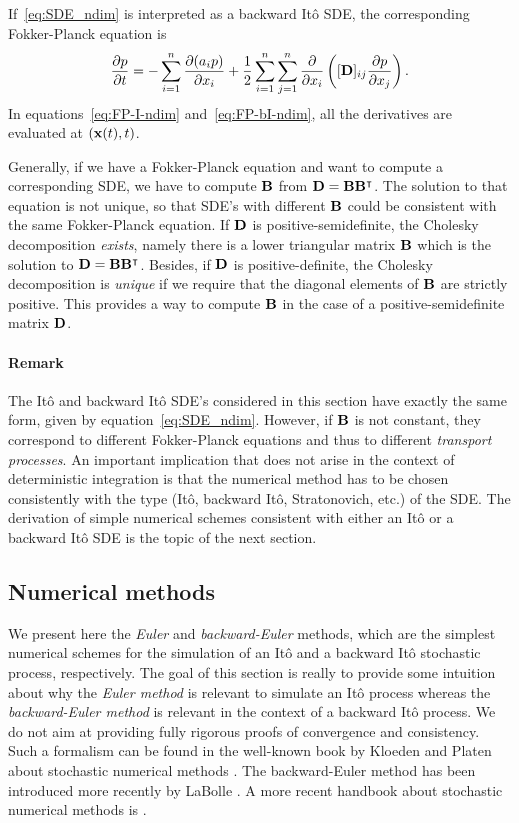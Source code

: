 If~\eqref{eq:SDE_ndim} is interpreted as a backward Itô SDE, the corresponding Fokker-Planck equation is
\begin{equation} \label{eq:FP-bI-ndim}
	\frac{\partial p}{\partial t} = -\sum_{i=1}^n \frac{\partial(a_ip)}{\partial x_i} + \frac{1}{2} \sum_{i=1}^n \sum_{j=1}^n \frac{\partial}{\partial x_i}\left( [\mathbf D]_{ij} \frac{\partial p}{\partial x_j} \right).
\end{equation}
In equations~\eqref{eq:FP-I-ndim} and~\eqref{eq:FP-bI-ndim}, all the derivatives are evaluated at $(\mathbf x(t),t)$.

Generally, if we have a Fokker-Planck equation and want to compute a corresponding SDE, we have to compute $\mathbf B$ from $\mathbf D = \mathbf B \mathbf B^{\intercal}$. The solution to that equation is not unique, so that SDE's with different $\mathbf B$ could be consistent with the same Fokker-Planck equation. If $\mathbf D$ is positive-semidefinite, the Cholesky decomposition \textit{exists}, namely there is a lower triangular matrix $\mathbf B$ which is the solution to $\mathbf D = \mathbf B \mathbf B^{\intercal}$. Besides, if $\mathbf D$ is positive-definite, the Cholesky decomposition is \textit{unique} if we require that the diagonal elements of $\mathbf B$ are strictly positive. This provides a way to compute $\mathbf B$ in the case of a positive-semidefinite matrix $\mathbf D$.

\paragraph{Remark} The Itô and backward Itô SDE's considered in this section have exactly the same form, given by equation~\eqref{eq:SDE_ndim}. However, if $\mathbf B$ is not constant, they correspond to different Fokker-Planck equations and thus to different \textit{transport processes}. An important implication that does not arise in the context of deterministic integration is that the numerical method has to be chosen consistently with the type (Itô, backward Itô, Stratonovich, etc.) of the SDE. The derivation of simple numerical schemes consistent with either an Itô or a backward Itô SDE is the topic of the next section.

\subsection{Numerical methods} \label{sec:numericalmethods}
We present here the \textit{Euler} and \textit{backward-Euler} methods, which are the simplest numerical schemes for the simulation of an Itô and a backward Itô stochastic process, respectively. The goal of this section is really to provide some intuition about why the \textit{Euler method} is relevant to simulate an Itô process whereas the \textit{backward-Euler method} is relevant in the context of a backward Itô process. We do not aim at providing fully rigorous proofs of convergence and consistency. Such a formalism can be found in the well-known book by Kloeden and Platen about stochastic numerical methods \cite{kloedenplaten1995numerical}. The backward-Euler method has been introduced more recently by LaBolle \cite{labolle2000diffusion}. A more recent handbook about stochastic numerical methods is \cite{colet2014stochastic}.

